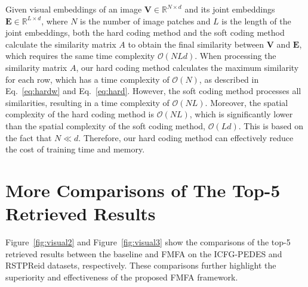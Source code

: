 \documentclass[acmsmall]{acmart}
\begin{document}
Given visual embeddings of an image $\boldsymbol{V}\in\mathbb{R}^{N\times d}$ and
its joint embeddings $\boldsymbol{E}\in\mathbb{R}^{L\times d}$,
where $N$ is the number of image patches and $L$ is the length of
the joint embeddings, both the hard coding method and the soft
coding method calculate the similarity matrix $A$ to obtain the
final similarity between $\boldsymbol{V}$ and $\boldsymbol{E}$,
which requires the same time complexity $\mathcal{O}(NLd)$. When
processing the similarity matrix $A$, our hard coding method
calculates the maximum similarity for each row, which has a time
complexity of $\mathcal{O}(N)$, as described in Eq.~\eqref{eq:hardw}
and Eq.~\eqref{eq:hard}. However, the soft coding method processes
all similarities, resulting in a time complexity of
$\mathcal{O}(NL)$. Moreover, the spatial complexity of the hard
coding method is $\mathcal{O}(NL)$, which is significantly lower
than the spatial complexity of the soft coding method,
$\mathcal{O}(Ld)$. This is based on the fact that $N\ll d$.
Therefore, our hard coding method can effectively reduce the cost of
training time and memory.

\section{More Comparisons of The Top-5 Retrieved Results}
\label{sec:comparision}

Figure~\ref{fig:visual2} and Figure~\ref{fig:visual3} show the
comparisons of the top-5 retrieved results between the baseline and
FMFA on the ICFG-PEDES and RSTPReid datasets, respectively. These
comparisons further highlight the superiority and effectiveness of
the proposed FMFA framework.
\end{document}
